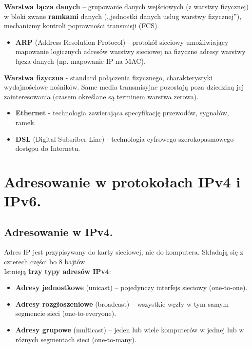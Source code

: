 \documentclass[12pt]{article}
\begin{document}
    \noindent \textbf{Warstwa łącza danych} – grupowanie danych wejściowych (z warstwy fizycznej) w bloki zwane \textbf{ramkami} danych („jednostki
    danych usług warstwy fizycznej”), mechanizmy kontroli poprawności
    transmisji (FCS).
    \begin{itemize}
        \item \textbf{ARP} (Address Resolution Protocol) - protokół sieciowy umożliwiający mapowanie logicznych
        adresów warstwy sieciowej na fizyczne adresy warstwy łącza danych (np. mapowanie IP na MAC).
    \end{itemize}

    \noindent \textbf{Warstwa fizyczna} - standard połączenia fizycznego, charakterystyki wydajnościowe nośników. Same media transmisyjne pozostają poza dziedziną jej
    zainteresowania (czasem określane są terminem warstwa zerowa).
    \begin{itemize}
        \item \textbf{Ethernet} - technologia zawierająca specyfikację przewodów, sygnałów, ramek.
        \item \textbf{DSL} (Digital Subsriber Line) - technologia cyfrowego szerokopasmowego dostępu do Internetu.
    \end{itemize}

    \newpage

    \section{Adresowanie w protokołach IPv4 i IPv6.}

    \subsection{Adresowanie w IPv4.}
    Adres IP jest przypisywany do karty sieciowej, nie do komputera. Składają się z czterech części bo 8 bajtów\\

    \noindent Istnieją \textbf{trzy typy adresów IPv4}:
    \begin{itemize}
        \item \textbf{Adresy jednostkowe} (unicast) – pojedynczy interfejs sieciowy (one-to-one).
        \item \textbf{Adresy rozgłoszeniowe} (broadcast) – wszystkie węzły w tym samym segmencie sieci (one-to-everyone).
        \item \textbf{Adresy grupowe} (multicast) – jeden lub wiele komputerów w jednej lub w różnych segmentach sieci (one-to-many).
    \end{itemize}
\end{document}
